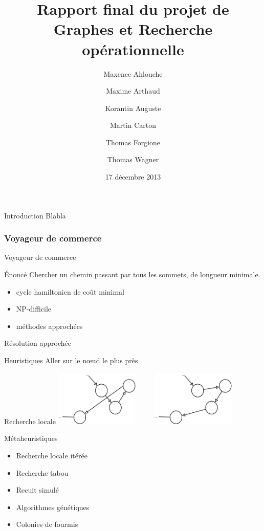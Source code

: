 \documentclass{beamer}
\title[Rapport final de GRO]
      {Rapport final du projet de\\Graphes et Recherche opérationnelle}
\institute{Enseeiht}
\author
  [Ahlouche \and Arthaud \and Auguste
    \and Carton \and Forgione \and Wagner]
  {Maxence Ahlouche \and Maxime Arthaud \and Korantin Auguste
    \and Martin Carton \and Thomas Forgione \and Thomas Wagner}
\date{17 décembre 2013}
\begin{document}
\begin{frame}
  \titlepage
\end{frame}

\begin{frame}{Introduction}
  Blabla
\end{frame}

\subsubsection{Voyageur de commerce}

\begin{frame}{Voyageur de commerce}
\end{frame}

\begin{frame}{Énoncé}
    Chercher un chemin passant par tous les sommets, de longueur minimale.
    \begin{itemize}
        \item cycle hamiltonien de coût minimal
        \item NP-difficile
        \item méthodes approchées
    \end{itemize}
\end{frame}

\begin{frame}{Résolution approchée}
    \begin{block}{Heuristiques}
        Aller sur le nœud le plus près
    \end{block}

    \begin{block}{Recherche locale}
        \centering
        \includegraphics[width=0.3\textwidth]{../rapport/graphes/2opt1.png}
        ~~~~ %
        \includegraphics[width=0.3\textwidth]{../rapport/graphes/2opt2.png}
    \end{block}
\end{frame}

\begin{frame}{Métaheuristiques}
    \begin{itemize}
        \item Recherche locale itérée
        \item Recherche tabou
        \item Recuit simulé
        \item Algorithmes génétiques
        \item Colonies de fourmis
    \end{itemize}
\end{frame}
\end{document}
